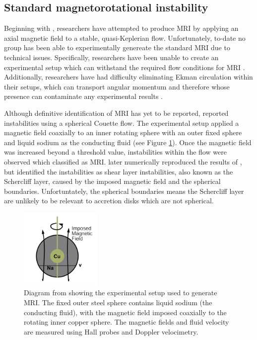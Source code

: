 \documentclass{jfm}
\begin{document}
%
%
\subsection{Standard magnetorotational instability}
\label{sec:standard_mri}
Beginning with \cite{Ji2001}, researchers have attempted to produce MRI by
applying an axial magnetic field to a stable, quasi-Keplerian flow.
Unfortunately, to-date no group has been able to experimentally genereate the
standard MRI due to technical issues. Specifically, researchers have been
unable to create an experimental setup which can withstand the required flow
conditions for MRI \citep{Ji2001, Ji2002}. Additionally, researchers have had
difficulty eliminating Ekman circulation within their setups, which can
transport angular momentum and therefore whose presence can contaminate any
experimental results \citep{Kageyama2004}.

Although definitive identification of MRI has yet to be reported,
\cite{Sisan2004} reported instabilities using a spherical Couette flow. The
experimental setup applied a magnetic field coaxially to an inner rotating
sphere with an outer fixed sphere and liquid sodium as the conducting fluid
(see Figure \ref{fig:diagram_Sisan}).  Once the magnetic field was increased
beyond a threshold value, instabilities within the flow were observed which
\cite{Sisan2004} classified as MRI.  \cite{Gissinger2011} later numerically
reproduced the results of \cite{Sisan2004}, but identified the instabilities as
shear layer instabilities, also known as the Schercliff layer, caused by the
imposed magnetic field and the spherical boundaries.  Unfortuntately, the
spherical boundaries means the Schercliff layer are unlikely to be relevant to
accretion disks which are not spherical.

\begin{figure}
    \centering
    \includegraphics[width=0.35\textwidth]{Sisan2004_diagram}
    \caption{Diagram from \cite{Sisan2004} showing the experimental setup used to generate MRI. The fixed outer steel sphere contains liquid sodium (the conducting fluid), with the magnetic field imposed coaxially to the rotating inner copper sphere. The magnetic fields and fluid velocity are measured using Hall probes and Doppler velocimetry.}
    \label{fig:diagram_Sisan}
\end{figure}
\end{document}
